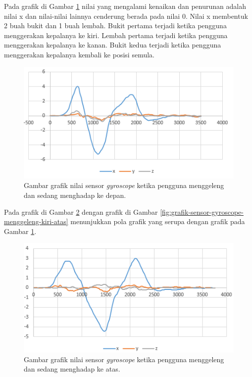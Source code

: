 Pada grafik di Gambar \ref{fig:grafik-sensor-gyroscope-menggeleng-depan} nilai yang mengalami kenaikan dan penurunan adalah nilai x dan nilai-nilai lainnya cenderung berada pada nilai 0. Nilai x membentuk 2 buah bukit dan 1 buah lembah. Bukit pertama terjadi ketika pengguna menggerakan kepalanya ke kiri. Lembah pertama terjadi ketika pengguna menggerakan kepalanya ke kanan. Bukit kedua terjadi ketika pengguna menggerakan kepalanya kembali ke posisi semula.

\begin{figure}[htbp]
\centering
\includegraphics[scale=1]{Gambar/grafik-sensor-gyroscope-menggeleng-depan.png}
\caption{Gambar grafik nilai sensor \textit{gyroscope} ketika pengguna menggeleng dan sedang menghadap ke depan.} 
\label{fig:grafik-sensor-gyroscope-menggeleng-depan}
\end{figure}

Pada grafik di Gambar \ref{fig:grafik-sensor-gyroscope-menggeleng-atas} dengan grafik di Gambar \ref{fig:grafik-sensor-gyroscope-menggeleng-kiri-atas} menunjukkan pola grafik yang serupa dengan grafik pada Gambar \ref{fig:grafik-sensor-gyroscope-menggeleng-depan}.

\begin{figure}[htbp]
\centering
\includegraphics[scale=1]{Gambar/grafik-sensor-gyroscope-menggeleng-atas.png}
\caption{Gambar grafik nilai sensor \textit{gyroscope} ketika pengguna menggeleng dan sedang menghadap ke atas.} 
\label{fig:grafik-sensor-gyroscope-menggeleng-atas}
\end{figure}

